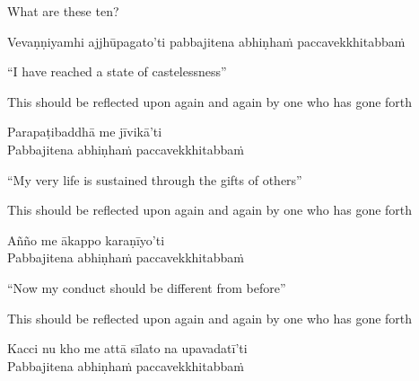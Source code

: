 \begin{english}
  What are these ten?
\end{english}

\begin{pali-hang}
  Vevaṇṇiyamhi ajjhūpagato'ti pabbajitena abhiṇhaṁ paccavekkhitabbaṁ
\end{pali-hang}

\begin{english-verses}
  ``I have reached a state of castelessness''\makeatletter\hyperlink{endnote100-appendix}\makeatother
  \begin{english-hangtogether-verses}
    This should be reflected upon again and again by one who has gone forth
  \end{english-hangtogether-verses}
\end{english-verses}

Parapaṭibaddhā me jīvikā'ti\\
Pabbajitena abhiṇhaṁ paccavekkhitabbaṁ

\begin{english-verses}
  ``My very life is sustained through the gifts of others''
  \begin{english-hangtogether-verses}
    This should be reflected upon again and again by one who has gone forth
  \end{english-hangtogether-verses}
\end{english-verses}

Añño me ākappo karaṇīyo'ti\\
Pabbajitena abhiṇhaṁ paccavekkhitabbaṁ

\begin{english-verses}
  ``Now my conduct should be different from before''\makeatletter\hyperlink{endnote101-appendix}\makeatother
  \begin{english-hangtogether-verses}
    This should be reflected upon again and again by one who has gone forth
  \end{english-hangtogether-verses}
\end{english-verses}

Kacci nu kho me attā sīlato na upavadatī'ti\\
Pabbajitena abhiṇhaṁ paccavekkhitabbaṁ

